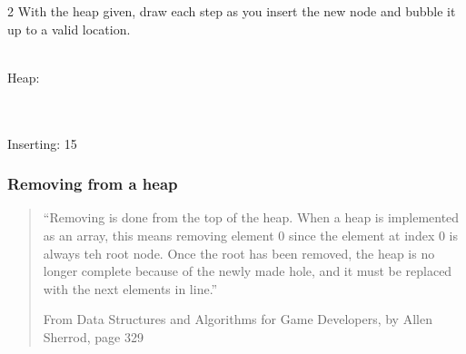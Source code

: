 \documentclass[a4paper,12pt,oneside]{book}
\newcounter{question}
\begin{document}
    \begin{question}{\thequestion}{2}
        With the heap given, draw each step as you insert the new node and
        bubble it up to a valid location. 

        ~\\
        Heap: ~\\~\\

        ~\\
        Inserting: 15
    \end{question}

    
    \newpage

    \subsubsection{Removing from a heap}

        \begin{quote}
            ``Removing is done from the top of the heap. When a heap is implemented
            as an array, this means removing element 0 since the element at index 0 is always
            teh root node. Once the root has been removed, the heap is no longer complete
            because of the newly made hole, and it must be replaced with the next elements in line.''
            
            \footnotesize
            From Data Structures and Algorithms for Game Developers, by Allen Sherrod, page 329            
        \end{quote}
\end{document}
